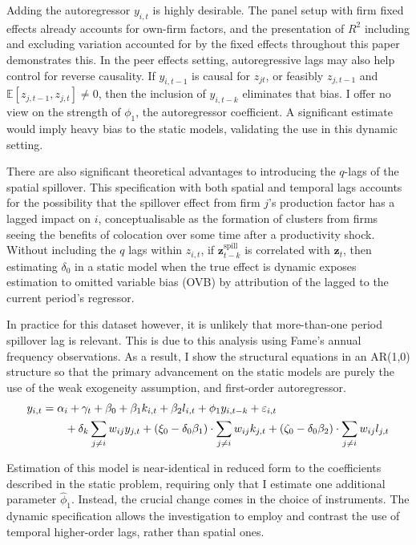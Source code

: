 Adding the autoregressor $y_{i,t}$ is highly desirable.
The panel setup with firm fixed effects already accounts for own-firm factors,
and the presentation of $R^2$ including and excluding variation accounted for by the fixed effects
throughout this paper demonstrates this.
In the peer effects setting, autoregressive lags may also help control for reverse causality.
If $y_{i,t-1}$ is causal for $z_{jt}$,
or feasibly $z_{j,t-1}$ and $\mathbb E[z_{j,t-1}, z_{j,t}]\neq0$,
then the inclusion of $y_{i,t-k}$ eliminates that bias.
I offer no  view on the strength of $\phi_1$, the autoregressor coefficient.
A significant estimate would imply heavy bias to the static models, validating the use in this dynamic setting.
\par
There are also significant theoretical advantages to introducing the $q$-lags of the spatial spillover.
This specification with both spatial and temporal lags accounts for the possibility
that the spillover effect from firm $j$'s production factor
has a lagged impact on $i$, conceptualisable as the formation of clusters
from firms seeing the benefits of colocation over some time after a productivity shock.
Without including the $q$ lags within $z_{i,t}$,
if $\mathbf z_{t-k}^\text{spill}$ is correlated with $\mathbf z_{t}$,
then estimating $\delta_0$ in a static model when the true effect is dynamic
exposes estimation to omitted variable bias (OVB) by attribution of the lagged to the current period's regressor.
\par
In practice for this dataset however, it is unlikely that more-than-one period spillover lag is relevant.
This is due to this analysis using Fame's annual frequency observations.
As a result, I show the structural equations in an AR(1,0) structure
so that the primary advancement on the static models
are purely the use of the weak exogeneity assumption, and first-order autoregressor.
\begin{align}
    \label{eq:dyn-main-ar10}
    y_{i,t} &= \alpha_i + \gamma_t + \beta_0 + \beta_1 k_{i,t} + \beta_2 l_{i,t} 
                + \phi_1 y_{i,t-k} + \varepsilon_{i,t}
                \\ \notag &\qquad 
                + \delta_k \sum_{j\neq i} w_{ij}y_{j,t}
                + (\xi_0-\delta_0\beta_1) \cdot \sum_{j\neq i} w_{ij}k_{j,t}
                + (\zeta_0-\delta_0\beta_2) \cdot \sum_{j\neq i} w_{ij}l_{j,t}
\end{align}

Estimation of this model is near-identical in reduced form
to the coefficients described in the static problem,
requiring only that I estimate one additional parameter $\hat\phi_1$.
Instead, the crucial change comes in the choice of instruments.
The dynamic specification allows the investigation to
employ and contrast the use
of temporal higher-order lags, rather than spatial ones.

